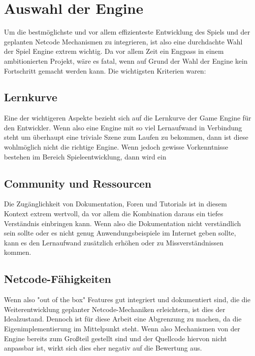 \chapter{Auswahl der Engine}
Um die bestmöglichste und vor allem effizienteste Entwicklung des Spiels und der geplanten Netcode Mechanismen zu integrieren, ist also eine durchdachte Wahl der Spiel Engine extrem wichtig.
Da vor allem Zeit ein Engpass in einem ambitionierten Projekt, wäre es fatal, wenn auf Grund der Wahl der Engine kein Fortschritt gemacht werden kann. 
Die wichtigsten Kriterien waren: 

\section{Lernkurve}
Eine der wichtigeren Aspekte bezieht sich auf die Lernkurve der Game Engine für den Entwickler. Wenn also eine Engine mit so viel Lernaufwand in Verbindung steht um überhaupt eine triviale Szene zum Laufen zu bekommen, dann ist diese wohlmöglich nicht die richtige Engine.
Wenn jedoch gewisse Vorkenntnisse bestehen im Bereich Spieleentwicklung, dann wird ein  

\section{Community und Ressourcen} 
Die Zugänglichkeit von Dokumentation, Foren und Tutorials ist in diesem Kontext extrem wertvoll, da vor allem die Kombination daraus ein tiefes Verständnis einbringen kann. Wenn also die Dokumentation nicht verständlich sein sollte oder es nicht genug Anwendungsbeispiele im Internet geben sollte, kann es den Lernaufwand zusätzlich erhöhen oder zu Missverständnissen kommen.

\section{Netcode-Fähigkeiten}
Wenn also "out of the box" Features gut integriert und dokumentiert sind, die die Weiterentwicklung geplanter Netcode-Mechaniken erleichtern, ist dies der Idealzustand. 
Dennoch ist für diese Arbeit eine Abgrenzung zu machen, da die Eigenimplementierung im Mittelpunkt steht. Wenn also Mechanismen von der Engine bereits zum Großteil gestellt sind und der Quellcode hiervon nicht anpassbar ist, wirkt sich dies eher negativ auf die Bewertung aus.

